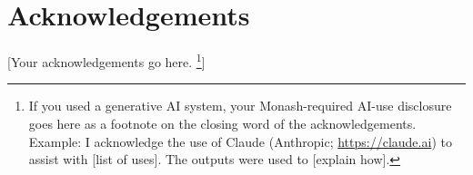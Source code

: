 %
%
\chapter*{Acknowledgements}


[Your acknowledgements go here.%
\footnote{If you used a generative AI system, your Monash-required AI-use
disclosure goes here as a footnote on the closing word of the
acknowledgements. Example: I acknowledge the use of Claude (Anthropic;
\url{https://claude.ai}) to assist with [list of uses]. The outputs were
used to [explain how].}]

\cleardoublepage
